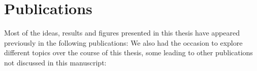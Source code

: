 \documentclass[../thesis.tex]{subfiles}
\begin{document}
\chapter*{Publications}


Most of the ideas, results and figures presented in this thesis have appeared previously
in the following publications:
\printbibliography[heading=none,category=thesis_articles]
We also had the occasion to explore different topics over the course of this thesis,
some leading to other publications not discussed in this manuscript:
\nocite{GanicDynamicNoise2020}
\printbibliography[heading=none,category=other_articles]
\end{document}
